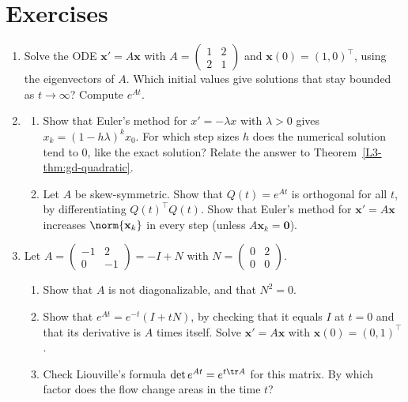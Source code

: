 \section{Exercises}\label{L5-sec:exercises}
\begin{enumerate}[leftmargin=*]
    \item Solve the ODE $\mathbf{x}' = A\mathbf{x}$ with $A = \begin{pmatrix} 1 & 2 \\ 2 & 1 \end{pmatrix}$ and $\mathbf{x}(0) = (1, 0)^\top$, using the eigenvectors of $A$. Which initial values give solutions that stay bounded as $t \to \infty$? Compute $e^{At}$.
    \item\label{L5-ex5:euler-skew} \begin{enumerate}[label=(\alph*)]
        \item Show that Euler's method for $x' = -\lambda x$ with $\lambda > 0$ gives $x_k = (1 - h\lambda)^k x_0$. For which step sizes $h$ does the numerical solution tend to $0$, like the exact solution? Relate the answer to Theorem~\ref{L3-thm:gd-quadratic}.
        \item Let $A$ be skew-symmetric. Show that $Q(t) = e^{At}$ is orthogonal for all $t$, by differentiating $Q(t)^\top Q(t)$. Show that Euler's method for $\mathbf{x}' = A\mathbf{x}$ increases $\norm{\mathbf{x}_k}$ in every step (unless $A\mathbf{x}_k = \mathbf{0}$).
    \end{enumerate}
    \item\label{L5-ex5:nilpotent} Let $A = \begin{pmatrix} -1 & 2 \\ 0 & -1 \end{pmatrix} = -I + N$ with $N = \begin{pmatrix} 0 & 2 \\ 0 & 0 \end{pmatrix}$.
    \begin{enumerate}[label=(\alph*)]
        \item Show that $A$ is not diagonalizable, and that $N^2 = 0$.
        \item Show that $e^{At} = e^{-t}(I + tN)$, by checking that it equals $I$ at $t = 0$ and that its derivative is $A$ times itself. Solve $\mathbf{x}' = A\mathbf{x}$ with $\mathbf{x}(0) = (0, 1)^\top$.
        \item Check Liouville's formula $\det e^{At} = e^{t\tr A}$ for this matrix. By which factor does the flow change areas in the time $t$?
    \end{enumerate}

\end{enumerate}

